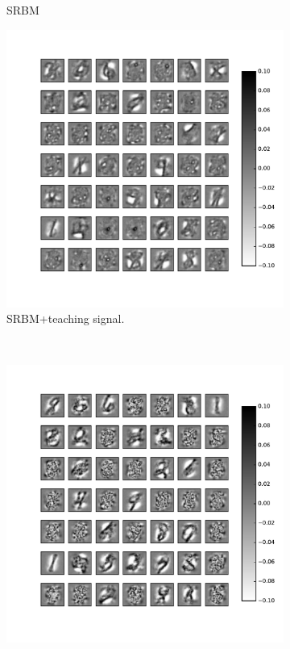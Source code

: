 \begin{figure}
\begin{subfigure}[t]{0.4\textwidth}
		\caption{SRBM}
	\end{subfigure}
	\begin{subfigure}[t]{0.4\textwidth}
		\includegraphics[width=\textwidth]{pics_sdlm/51_MNIST_SRBM_teach/2_60000_0.pdf}
		\caption{SRBM+teaching signal.}
	\end{subfigure}\\
	\begin{subfigure}[t]{0.4\textwidth}
		\includegraphics[width=\textwidth]{pics_sdlm/noise_rbm/2_60000_0.pdf}

\end{subfigure}
\end{figure}
